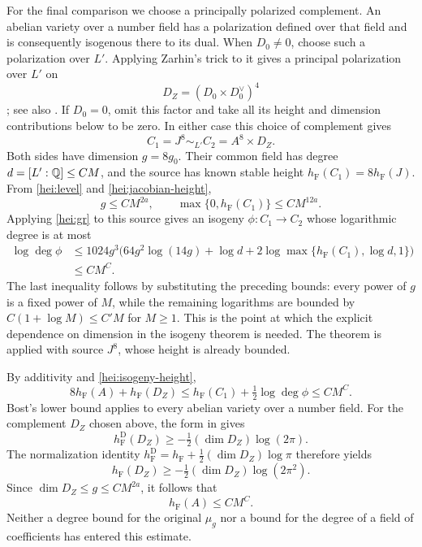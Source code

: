 For the final comparison we choose a principally polarized complement.
An abelian variety over a number field has a polarization defined over
that field and is consequently isogenous there to its dual.  When
$D_0\ne0$, choose such a polarization over $L'$.  Applying Zarhin's
trick to it gives a principal polarization over $L'$ on
\[
                 D_Z=(D_0\times D_0^\vee)^4
\]
\cite[Theorem~1.1(ii) and Remark~1.4]{Zarhin2023Quaternion}; see also
\cite[proof of Corollary~3.2]{Bost1996Bourbaki}.  If $D_0=0$, omit
this factor and take all its height and dimension contributions below
to be zero.  In either case this choice of complement gives
\[
                 C_1=J^8\sim_{L'} C_2=A^8\times D_Z.
\]
Both sides have dimension $g=8g_0$.  Their common field has degree
$d=[L':\mathbb Q]\le C M$, and the source has known stable height
$h_{\mathrm F}(C_1)=8h_{\mathrm F}(J)$.  From
\eqref{hei:level} and \eqref{hei:jacobian-height},
\[
           g\le C M^{2a},\qquad
           \max\{0,h_{\mathrm F}(C_1)\}\le C M^{12a}.
\]
Applying \eqref{hei:gr} to this source gives an isogeny
$\phi:C_1\to C_2$ whose logarithmic degree is at most
\begin{align}
 \log\deg\phi
 &\le1024g^3\bigl(64g^2\log(14g)+\log d
       +2\log\max\{h_{\mathrm F}(C_1),\log d,1\}\bigr)
       \label{hei:log-isogeny}\\
 &\le C M^C.\nonumber
\end{align}
The last inequality follows by substituting the preceding bounds:
every power of $g$ is a fixed power of $M$, while the remaining
logarithms are bounded by $C(1+\log M)\le C'M$ for $M\ge1$.
This is the point at which the explicit dependence on dimension in
the isogeny theorem is needed.  The theorem is applied with source
$J^8$, whose height is already bounded.

By additivity and \eqref{hei:isogeny-height},
\[
             8h_{\mathrm F}(A)+h_{\mathrm F}(D_Z)
        \le h_{\mathrm F}(C_1)+\tfrac12\log\deg\phi
        \le C M^C.
\]
Bost's lower bound applies to every abelian variety over a number field.
For the complement $D_Z$ chosen above, the form in
\cite[Corollary~8.4]{GaudronRemondPeriods2014} gives
\[
 h_{\mathrm F}^{\mathrm D}(D_Z)\ge
 -\tfrac12(\dim D_Z)\log(2\pi).
\]
The normalization identity
$h_{\mathrm F}^{\mathrm D}=h_{\mathrm F}
+\tfrac12(\dim D_Z)\log\pi$
therefore yields
\[
 h_{\mathrm F}(D_Z)\ge
 -\tfrac12(\dim D_Z)\log(2\pi^2).
\]
Since $\dim D_Z\le g\le C M^{2a}$, it follows that
\begin{equation}\label{hei:faltings-final}
                              h_{\mathrm F}(A)\le C M^C.
\end{equation}
Neither a degree bound for the original $\mu_g$ nor a bound for the
degree of a field of coefficients has entered this estimate.

